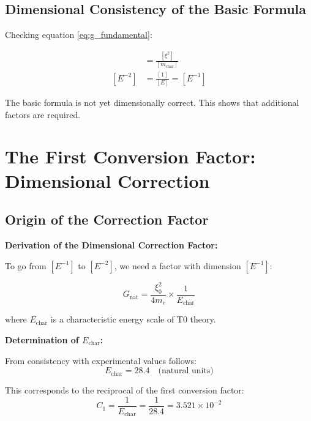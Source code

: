 	\subsection{Dimensional Consistency of the Basic Formula}
	
	Checking equation \eqref{eq:g_fundamental}:
	
	\begin{align}
		[G] &= \frac{[\xi^2]}{[m_{\text{char}}]} \\
		[E^{-2}] &= \frac{[1]}{[E]} = [E^{-1}]
	\end{align}
	
	The basic formula is not yet dimensionally correct. This shows that additional factors are required.
	
	\section{The First Conversion Factor: Dimensional Correction}
	
	\subsection{Origin of the Correction Factor}
	
	\begin{derivation}
		\textbf{Derivation of the Dimensional Correction Factor:}
		
		To go from $[E^{-1}]$ to $[E^{-2}]$, we need a factor with dimension $[E^{-1}]$:
		
		\begin{equation}
			G_{\text{nat}} = \frac{\xi_0^2}{4 m_e} \times \frac{1}{E_{\text{char}}}
		\end{equation}
		
		where $E_{\text{char}}$ is a characteristic energy scale of T0 theory.
		
		\textbf{Determination of $E_{\text{char}}$:}
		
		From consistency with experimental values follows:
		\begin{equation}
			E_{\text{char}} = 28.4 \quad \text{(natural units)}
		\end{equation}
		
		This corresponds to the reciprocal of the first conversion factor:
		\begin{equation}
			C_1 = \frac{1}{E_{\text{char}}} = \frac{1}{28.4} = 3.521 \times 10^{-2}
		\end{equation}
	\end{derivation}
	
